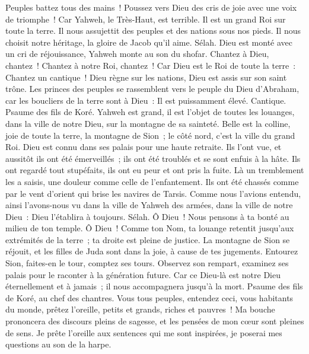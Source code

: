 \begin{multicols}{2}
Peuples battez tous des mains~! Poussez vers Dieu des cris de joie avec une voix de triomphe~!
Car Yahweh, le Très-Haut, est terrible. Il est un grand Roi sur toute la terre.
Il nous assujettit des peuples et des nations sous nos pieds.
Il nous choisit notre héritage, la gloire de Jacob qu'il aime. Sélah.
Dieu est monté avec un cri de réjouissance, Yahweh monte au son du shofar.
Chantez à Dieu, chantez~! Chantez à notre Roi, chantez~!
Car Dieu est le Roi de toute la terre~: Chantez un cantique~!
Dieu règne sur les nations, Dieu est assis sur son saint trône.
Les princes des peuples se rassemblent vers le peuple du Dieu d'Abraham, car les boucliers de la terre sont à Dieu~: Il est puissamment élevé.
\VerseOne{}Cantique. Psaume des fils de Koré.
Yahweh est grand, il est l'objet de toutes les louanges, dans la ville de notre Dieu, sur la montagne de sa sainteté.
Belle est la colline, joie de toute la terre, la montagne de Sion~; le côté nord, c'est la ville du grand Roi.
Dieu est connu dans ses palais pour une haute retraite.
Ils l'ont vue, et aussitôt ils ont été émerveillés~; ils ont été troublés et se sont enfuis à la hâte.
Ils ont regardé tout stupéfaits, ils ont eu peur et ont pris la fuite.
Là un tremblement les a saisis, une douleur comme celle de l'enfantement.
Ils ont été chassés comme par le vent d'orient qui brise les navires de Tarsis.
Comme nous l'avions entendu, ainsi l'avons-nous vu dans la ville de Yahweh des armées, dans la ville de notre Dieu~: Dieu l'établira à toujours. Sélah.
Ô Dieu~! Nous pensons à ta bonté au milieu de ton temple.
Ô Dieu~! Comme ton Nom, ta louange retentit jusqu'aux extrémités de la terre~; ta droite est pleine de justice.
La montagne de Sion se réjouit, et les filles de Juda sont dans la joie, à cause de tes jugements.
Entourez Sion, faites-en le tour, comptez ses tours.
Observez son rempart, examinez ses palais pour le raconter à la génération future.
Car ce Dieu-là est notre Dieu éternellement et à jamais~; il nous accompagnera jusqu'à la mort.
\VerseOne{}Psaume des fils de Koré, au chef des chantres.
Vous tous peuples, entendez ceci, vous habitants du monde, prêtez l'oreille,
petits et grands, riches et pauvres~!
Ma bouche prononcera des discours pleins de sagesse, et les pensées de mon cœur sont pleines de sens.
Je prête l'oreille aux sentences qui me sont inspirées, je poserai mes questions au son de la harpe.

\end{multicols}
